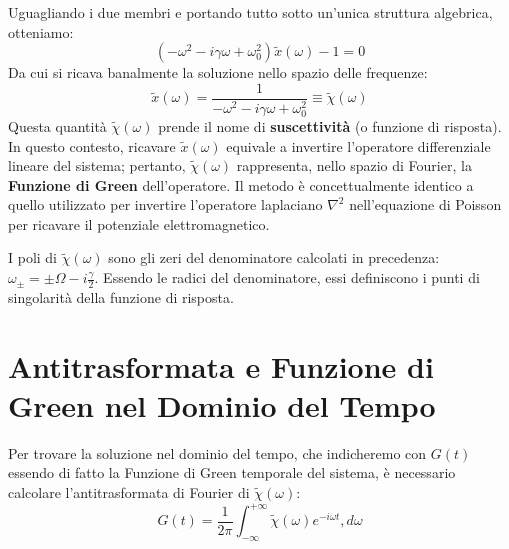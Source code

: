 Uguagliando i due membri e portando tutto sotto un'unica struttura algebrica, otteniamo:
\begin{equation}
\left(-\omega^2 - i\gamma\omega + \omega_0^2\right) \tilde{x}(\omega) - 1 = 0
\end{equation}
Da cui si ricava banalmente la soluzione nello spazio delle frequenze:
\begin{equation}
\tilde{x}(\omega) = \frac{1}{-\omega^2 - i\gamma\omega + \omega_0^2} \equiv \tilde{\chi}(\omega)
\end{equation}
Questa quantità $\tilde{\chi}(\omega)$ prende il nome di \textbf{suscettività} (o funzione di risposta). In questo contesto, ricavare $\tilde{x}(\omega)$ equivale a invertire l'operatore differenziale lineare del sistema; pertanto, $\tilde{\chi}(\omega)$ rappresenta, nello spazio di Fourier, la \textbf{Funzione di Green} dell'operatore. Il metodo è concettualmente identico a quello utilizzato per invertire l'operatore laplaciano $\nabla^2$ nell'equazione di Poisson per ricavare il potenziale elettromagnetico.

I poli di $\tilde{\chi}(\omega)$ sono gli zeri del denominatore calcolati in precedenza: $\omega_{\pm} = \pm \Omega - i\frac{\gamma}{2}$. Essendo le radici del denominatore, essi definiscono i punti di singolarità della funzione di risposta.

\section{Antitrasformata e Funzione di Green nel Dominio del Tempo}

Per trovare la soluzione nel dominio del tempo, che indicheremo con $G(t)$ essendo di fatto la Funzione di Green temporale del sistema, è necessario calcolare l'antitrasformata di Fourier di $\tilde{\chi}(\omega)$:
\begin{equation}
G(t) = \frac{1}{2\pi} \int_{-\infty}^{+\infty} \tilde{\chi}(\omega) e^{-i\omega t} , d\omega
\end{equation}

